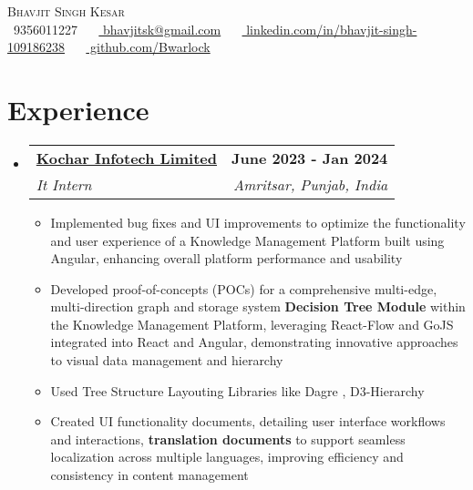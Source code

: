 \documentclass[letterpaper,11pt]{article}
\makeatletter
\newcommand{\resumeItem}[1]{
  \item\small{
    {#1 \vspace{-2pt}}
  }
}
\newcommand{\resumeSubheading}[4]{
  \vspace{-2pt}\item
    \begin{tabular*}{1.0\textwidth}[t]{l@{\extracolsep{\fill}}r}
      \textbf{#1} & \textbf{\small #2} \\
      \textit{\small#3} & \textit{\small #4} \\
    \end{tabular*}\vspace{-7pt}
}
\newcommand{\resumeSubHeadingListStart}{\begin{itemize}[leftmargin=0.0in, label={}]}
\newcommand{\resumeSubHeadingListEnd}{\end{itemize}}
\newcommand{\resumeItemListStart}{\justify \begin{itemize} \vspace{-4pt}}
\newcommand{\resumeItemListEnd}{\end{itemize}\vspace{-1pt}}
\makeatother
\begin{document}


\begin{center}
    {\Huge \scshape Bhavjit Singh Kesar} \\ \vspace{1pt}
    \vspace{5pt}
    \small \raisebox{-0.1\height}\faPhone\ 9356011227 ~ 
    \raisebox{-0.2\height}\faEnvelope\ \href{mailto:bhavjitsk@gmail.com}{ bhavjitsk@gmail.com} ~ 
    \raisebox{-0.2\height}\faLinkedin\ \href{https://www.linkedin.com/in/bhavjit-singh-109186238}{ linkedin.com/in/bhavjit-singh-109186238}  ~
    \raisebox{-0.2\height}\faGithub\ \href{https://github.com/Bwarlock}{ github.com/Bwarlock}
    \vspace{-8pt}
\end{center}


\section{Experience}
  \resumeSubHeadingListStart
    \resumeSubheading
      {\href{https://www.kochartech.com/}{Kochar Infotech Limited}}{June 2023 - Jan 2024}
      {It Intern}{Amritsar, Punjab, India}
      \resumeItemListStart
        \resumeItem{Implemented bug fixes and UI improvements to optimize the functionality and user experience of a Knowledge Management Platform built using Angular, enhancing overall platform performance and usability}
        \resumeItem{Developed proof-of-concepts (POCs) for a comprehensive multi-edge, multi-direction graph and storage system \textbf{Decision Tree Module} within the Knowledge Management Platform, leveraging React-Flow and GoJS integrated into React and Angular, demonstrating innovative approaches to visual data management and hierarchy}
        \resumeItem{Used Tree Structure Layouting Libraries like Dagre , D3-Hierarchy}
        \resumeItem{Created UI functionality documents, detailing user interface workflows and interactions, \textbf{translation documents} to support seamless localization across multiple languages, improving efficiency and consistency in content management}
      \resumeItemListEnd   
  \resumeSubHeadingListEnd
\end{document}
